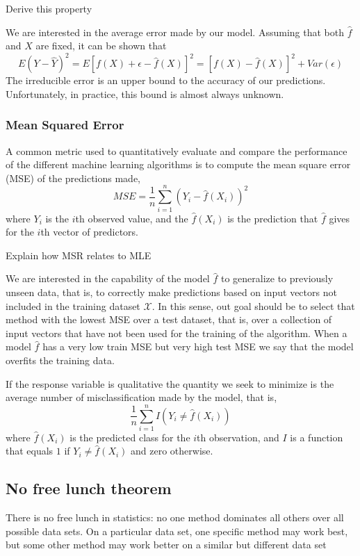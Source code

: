     {\color{red} Derive this property}

We are interested in the average error made by our model. Assuming that both $\hat{f}$ and $X$ are fixed, it can be shown that
\[
    E\left(Y-\hat{Y}\right)^{2}=E\left[f\left(X\right)+\epsilon-\hat{f}\left(X\right)\right]^{2}=\left[f\left(X\right)-\hat{f}\left(X\right)\right]^{2}+Var\left(\epsilon\right)
\]
The irreducible error is an upper bound to the accuracy of our predictions. Unfortunately, in practice, this bound is almost always unknown.


\subsubsection{Mean Squared Error}

A common metric used to quantitatively evaluate and compare the performance of the different machine learning algorithms is to compute the mean square error (MSE) of the predictions made,
\[
    MSE = \frac{1}{n} \sum_{i=1}^n \left( Y_i - \hat{f}(X_i) \right) ^ 2
\]
where $Y_i$ is the $i$th observed value, and the $\hat{f}(X_i)$ is the prediction that $\hat{f}$ gives for the $i$th vector of predictors.

    {\color{red} Explain how MSR relates to MLE}

We are interested in the capability of the model $\hat{f}$ to generalize to previously unseen data, that is, to correctly make predictions based on input vectors not included in the training dataset $\mathcal{X}$. In this sense, out goal should be to select that method with the lowest MSE over a test dataset, that is, over a collection of input vectors that have not been used for the training of the algorithm. When a model $\hat{f}$ has a very low train MSE but very high test MSE we say that the model overfits the training data.

If the response variable is qualitative the quantity we seek to minimize is the average number of misclassification made by the model, that is,
\[
    \frac{1}{n} \sum_{i=1}^n I \left( Y_i \neq \hat{f}(X_i) \right)
\]
where $\hat{f}(X_i)$ is the predicted class for the $i$th observation, and $I$ is a function that equals $1$ if $Y_i \neq \hat{f}(X_i)$ and zero otherwise.

\subsection{No free lunch theorem}

{\color{red} There is no free lunch in statistics: no one method dominates all others over all possible data sets. On a particular data set, one specific method may work best, but some other method may work better on a similar but different data set}

